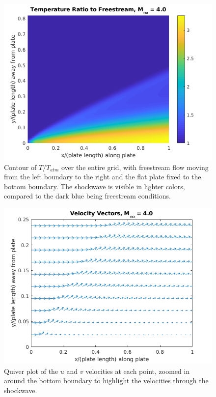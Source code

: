 \documentclass[10pt,a4paper]{article}
\begin{document}
\begin{figure}[!htb]
	\begin{center}
		\includegraphics[scale=0.7]{images/UpperFlatPlate_TempMap.png} 
		\caption{Contour of $T/T_{atm}$ over the entire grid, with freestream flow moving from the left boundary to the right and the flat plate fixed to the bottom boundary. The shockwave is visible in lighter colors, compared to the dark blue being freestream conditions.}
		\label{fig:UpperFlatPlate_TempMap}
	\end{center}
\end{figure}

\begin{figure}[!htb]
	\begin{center}
		\includegraphics[scale=0.7]{images/UpperFlatPlate_VelocityVectors.png} 
		\caption{Quiver plot of the $u$ and $v$ velocities at each point, zoomed in around the bottom boundary to highlight the velocities through the shockwave.}
		\label{fig:UpperFlatPlate_VelocityVectors}
	\end{center}
\end{figure}
\end{document}
